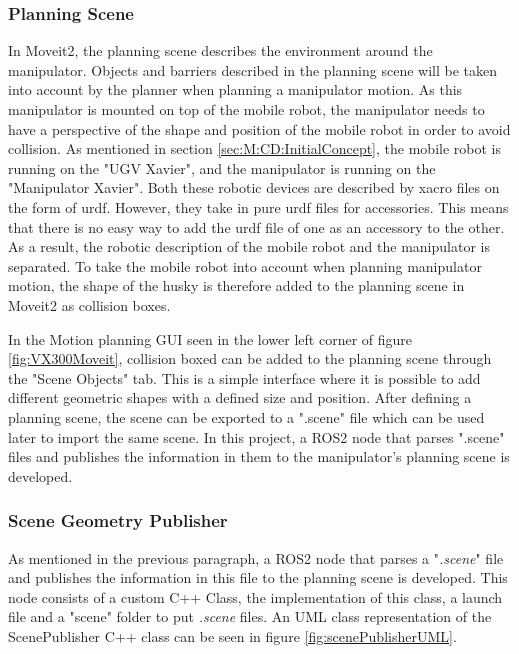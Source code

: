 \subsubsection{Planning Scene}
In Moveit2, the planning scene describes the environment around the manipulator. Objects and barriers described in the planning scene will be taken into account by the planner when planning a manipulator motion. As this manipulator is mounted on top of the mobile robot, the manipulator needs to have a perspective of the shape and position of the mobile robot in order to avoid collision. As mentioned in section \ref{sec:M:CD:InitialConcept}, the mobile robot is running on the "UGV Xavier", and the manipulator is running on the "Manipulator Xavier". Both these robotic devices are described by xacro files on the form of urdf. However, they take in pure urdf files for accessories. This means that there is no easy way to add the urdf file of one as an accessory to the other. As a result, the robotic description of the mobile robot and the manipulator is separated. To take the mobile robot into account when planning manipulator motion, the shape of the husky is therefore added to the planning scene in Moveit2 as collision boxes.

In the Motion planning GUI seen in the lower left corner of figure \ref{fig:VX300Moveit}, collision boxed can be added to the planning scene through the "Scene Objects" tab. This is a simple interface where it is possible to add different geometric shapes with a defined size and position. After defining a planning scene, the scene can be exported to a ".scene" file which can be used later to import the same scene. In this project, a ROS2 node that parses ".scene" files and publishes the information in them to the manipulator's planning scene is developed.

\subsubsection{Scene Geometry Publisher} \label{sec:M:PAP:SceneGeometryPublisher}
As mentioned in the previous paragraph, a ROS2 node that parses a "\textit{.scene}" file and publishes the information in this file to the planning scene is developed. This node consists of a custom C++ Class, the implementation of this class, a launch file and a "scene" folder to put \textit{.scene} files. An UML class representation of the ScenePublisher C++ class can be seen in figure \ref{fig:scenePublisherUML}.

